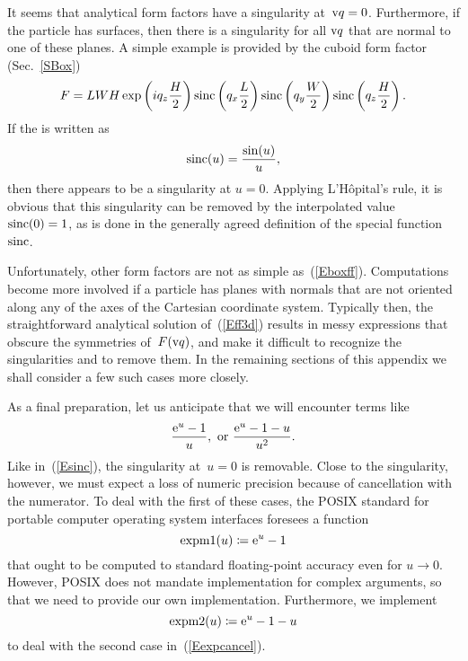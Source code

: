 %
It seems that  analytical form factors have a singularity at~$\text{v}{q}=0$.
Furthermore, if the particle has  surfaces,
then there is a singularity for all $\text{v}{q}$ that are normal to one of these planes.
A simple example is provided by the cuboid form factor (Sec.~\ref{SBox})
\begin{equation}\label{Eboxff}
F= L W H\exp\left(i q_z \frac{H}{2}\right) \operatorname{sinc}\left(q_x \frac{L}{2}\right)
\operatorname{sinc}\left(q_y \frac{W}{2}\right) \operatorname{sinc}\left(q_z \frac{H}{2}\right).
\end{equation}
If the  is written as
\begin{equation}\label{Esinc}
  \operatorname{sinc}(u) = \frac{\sin(u)}{u},
\end{equation}
then there appears to be a singularity at $u=0$.
Applying L'H\^opital's rule, it is obvious
that this singularity can be removed by the interpolated value
$\operatorname{sinc}(0)=1$,
as is done in the generally agreed definition of the special function~$\operatorname{sinc}$.

Unfortunately, other form factors are not as simple as~(\ref{Eboxff}).
Computations become more involved
if a particle has planes with normals that are not oriented along
any of the axes of the Cartesian coordinate system.
Typically then, the straightforward analytical solution of~(\ref{Eff3d})
results in messy expressions that obscure the symmetries of~$F(\text{v}{q})$,
and make it difficult to recognize the singularities and
to remove them.
In the remaining sections of this appendix
we shall consider a few such cases more closely.

As a final preparation,
let us anticipate that we will encounter terms like
\begin{equation}\label{Eexpcancel}
  \frac{\text{e}^u-1}{u},\text{~or~}\frac{\text{e}^u-1-u}{u^2}.
\end{equation}
Like in~(\ref{Esinc}), the singularity at~$u=0$ is removable.
Close to the singularity, however, we must expect a loss of numeric
precision because of cancellation with the numerator.
To deal with the first of these cases, the POSIX standard
for portable computer operating system interfaces foresees a function
\begin{equation}\label{Eexpm1}
  \operatorname{expm1}(u)\coloneqq \text{e}^u-1
\end{equation}
that ought to be computed to standard floating-point accuracy
even for $u\to0$.
However, POSIX does not mandate implementation for complex arguments,
so that we need to provide our own implementation.
Furthermore,
we implement
\begin{equation}\label{Eexpm1}
  \operatorname{expm2}(u)\coloneqq \text{e}^u-1-u
\end{equation}
to deal with the second case in~(\ref{Eexpcancel}).

